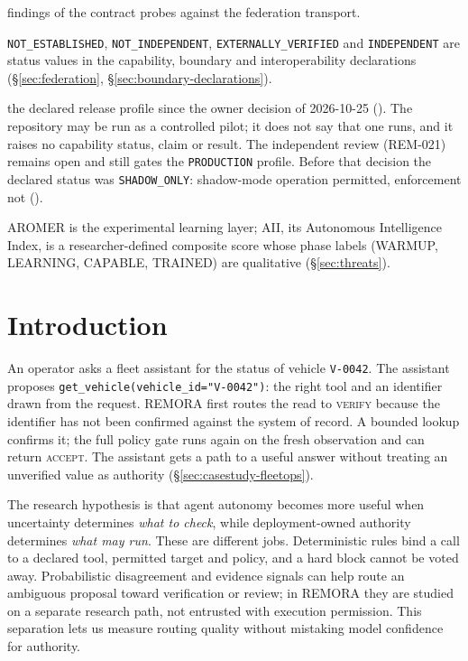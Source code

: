 \documentclass[10pt,twocolumn]{article}
\begin{document}
\begin{description}[leftmargin=1.2em,itemsep=1pt,font=\normalfont\bfseries]
  findings of the contract probes against the federation transport.
\item[Status values] \texttt{NOT\_\allowbreak ESTABLISHED}, \texttt{NOT\_\allowbreak INDEPENDENT},
  \texttt{EXTERNALLY\_\allowbreak VERIFIED} and \texttt{INDEPENDENT} are status values in
  the capability, boundary and interoperability declarations
  (\S\ref{sec:federation}, \S\ref{sec:boundary-declarations}).
\item[CONTROLLED\_PILOT] the declared release profile since the owner
  decision of 2026-10-25
  (). The
  repository may be run as a controlled pilot; it does not say that one
  runs, and it raises no capability status, claim or result. The
  independent review (REM-021) remains open and still gates the
  \texttt{PRODUCTION} profile. Before that decision the declared status
  was \texttt{SHADOW\_ONLY}: shadow-mode operation permitted, enforcement
  not ().
\item[AROMER, AII] AROMER is the experimental learning layer; AII, its
  Autonomous Intelligence Index, is a researcher-defined composite score
  whose phase labels (WARMUP, LEARNING, CAPABLE, TRAINED) are qualitative
  (\S\ref{sec:threats}).
\end{description}

\section{Introduction}
\label{sec:intro}

An operator asks a fleet assistant for the status of vehicle
\texttt{V-0042}. The assistant proposes
\texttt{get\_vehicle(vehicle\_id="V-0042")}: the right tool and an
identifier drawn from the request. REMORA first routes the read to
\textsc{verify} because the identifier has not been confirmed against
the system of record. A bounded lookup confirms it; the full policy
gate runs again on the fresh observation and can return \textsc{accept}.
The assistant gets a path to a useful answer without treating an
unverified value as authority (\S\ref{sec:casestudy-fleetops}).

The research hypothesis is that agent autonomy becomes more useful
when uncertainty determines \emph{what to check}, while deployment-owned
authority determines \emph{what may run}. These are different jobs.
Deterministic rules bind a call to a declared tool, permitted target and
policy, and a hard block cannot be voted away. Probabilistic disagreement
and evidence signals can help route an ambiguous proposal toward
verification or review; in REMORA they are studied on a separate research
path, not entrusted with execution permission. This separation lets us
measure routing quality without mistaking model confidence for authority.
\end{document}
